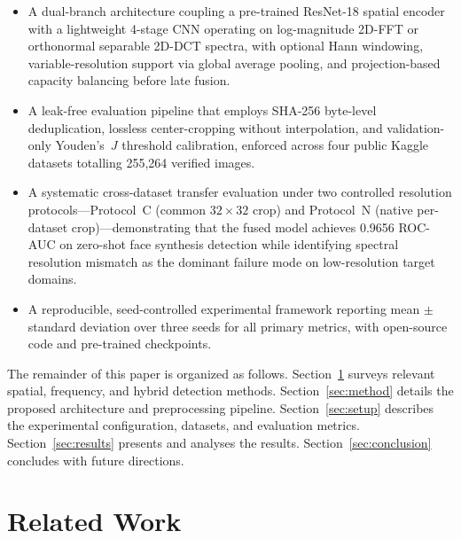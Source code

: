 \documentclass[conference]{IEEEtran}
\begin{document}
\begin{itemize}[leftmargin=*,nosep]
\item A dual-branch architecture coupling a pre-trained ResNet-18 spatial encoder with a lightweight 4-stage CNN operating on log-magnitude 2D-FFT or orthonormal separable 2D-DCT spectra, with optional Hann windowing, variable-resolution support via global average pooling, and projection-based capacity balancing before late fusion.

\item A leak-free evaluation pipeline that employs SHA-256 byte-level deduplication, lossless center-cropping without interpolation, and validation-only Youden's~$J$ threshold calibration, enforced across four public Kaggle datasets totalling 255{,}264 verified images.

\item A systematic cross-dataset transfer evaluation under two controlled resolution protocols---Protocol~C (common $32{\times}32$ crop) and Protocol~N (native per-dataset crop)---demonstrating that the fused model achieves 0.9656 ROC-AUC on zero-shot face synthesis detection while identifying spectral resolution mismatch as the dominant failure mode on low-resolution target domains.

\item A reproducible, seed-controlled experimental framework reporting mean $\pm$ standard deviation over three seeds for all primary metrics, with open-source code and pre-trained checkpoints.
\end{itemize}

The remainder of this paper is organized as follows. Section~\ref{sec:related} surveys relevant spatial, frequency, and hybrid detection methods. Section~\ref{sec:method} details the proposed architecture and preprocessing pipeline. Section~\ref{sec:setup} describes the experimental configuration, datasets, and evaluation metrics. Section~\ref{sec:results} presents and analyses the results. Section~\ref{sec:conclusion} concludes with future directions.



\section{Related Work}
\label{sec:related}
\end{document}
